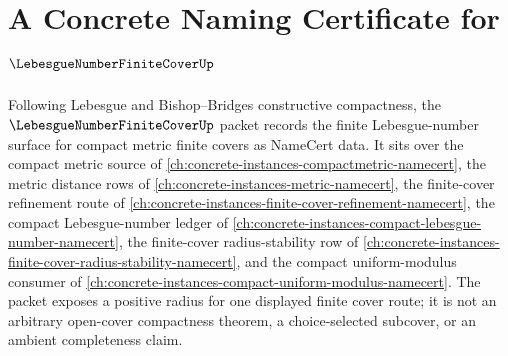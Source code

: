 \chapter{A Concrete Naming Certificate for $\LebesgueNumberFiniteCoverUp$}
\label{ch:concrete-instances-lebesgue-number-finite-cover-namecert}

Following Lebesgue and Bishop--Bridges constructive compactness, the $\LebesgueNumberFiniteCoverUp$ packet records the finite Lebesgue-number surface for compact metric finite covers as NameCert data. It sits over the compact metric source of \autoref{ch:concrete-instances-compactmetric-namecert}, the metric distance rows of \autoref{ch:concrete-instances-metric-namecert}, the finite-cover refinement route of \autoref{ch:concrete-instances-finite-cover-refinement-namecert}, the compact Lebesgue-number ledger of \autoref{ch:concrete-instances-compact-lebesgue-number-namecert}, the finite-cover radius-stability row of \autoref{ch:concrete-instances-finite-cover-radius-stability-namecert}, and the compact uniform-modulus consumer of \autoref{ch:concrete-instances-compact-uniform-modulus-namecert}. The packet exposes a positive radius for one displayed finite cover route; it is not an arbitrary open-cover compactness theorem, a choice-selected subcover, or an ambient completeness claim.

